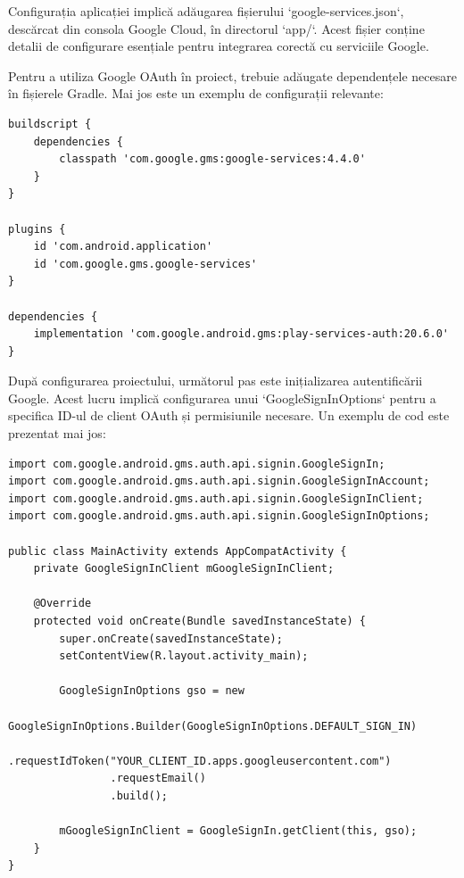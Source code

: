 \documentclass[runningheads]{llncs}
\begin{document}
Configurația aplicației implică adăugarea fișierului `google-services.json`, descărcat din consola Google Cloud, în directorul `app/`. Acest fișier conține detalii de configurare esențiale pentru integrarea corectă cu serviciile Google.


Pentru a utiliza Google OAuth în proiect, trebuie adăugate dependențele necesare în fișierele Gradle. Mai jos este un exemplu de configurații relevante:

\begin{lstlisting}
buildscript {
    dependencies {
        classpath 'com.google.gms:google-services:4.4.0'
    }
}

plugins {
    id 'com.android.application'
    id 'com.google.gms.google-services'
}

dependencies {
    implementation 'com.google.android.gms:play-services-auth:20.6.0'
}
\end{lstlisting}


După configurarea proiectului, următorul pas este inițializarea autentificării Google. Acest lucru implică configurarea unui `GoogleSignInOptions` pentru a specifica ID-ul de client OAuth și permisiunile necesare. Un exemplu de cod este prezentat mai jos:

\begin{lstlisting}
import com.google.android.gms.auth.api.signin.GoogleSignIn;
import com.google.android.gms.auth.api.signin.GoogleSignInAccount;
import com.google.android.gms.auth.api.signin.GoogleSignInClient;
import com.google.android.gms.auth.api.signin.GoogleSignInOptions;

public class MainActivity extends AppCompatActivity {
    private GoogleSignInClient mGoogleSignInClient;

    @Override
    protected void onCreate(Bundle savedInstanceState) {
        super.onCreate(savedInstanceState);
        setContentView(R.layout.activity_main);

        GoogleSignInOptions gso = new 
            GoogleSignInOptions.Builder(GoogleSignInOptions.DEFAULT_SIGN_IN)
                .requestIdToken("YOUR_CLIENT_ID.apps.googleusercontent.com")
                .requestEmail()
                .build();

        mGoogleSignInClient = GoogleSignIn.getClient(this, gso);
    }
}
\end{lstlisting}
\end{document}
